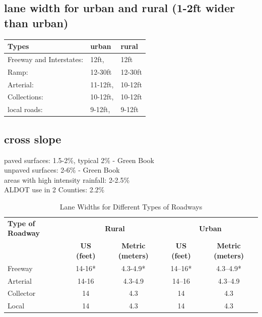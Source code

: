 \documentclass{article}
\begin{document}
  \subsection{lane width for urban and rural (1-2ft wider than urban)}
  \begin{tabular}{|l|l|l|}
    Types & urban & rural \\
    \hline
    Freeway and Interstates: & 12ft, & 12ft\\
    Ramp: & 12-30ft & 12-30ft \\ 
    Arterial: & 11-12ft, & 10-12ft \\
    Collections: & 10-12ft, & 10-12ft\\
    local roads: & 9-12ft, & 9-12ft  \\
  \end{tabular}

  \subsection{cross slope}
  paved surfaces: 1.5-2\%, typical 2\%  - Green Book\\
  unpaved surfaces: 2-6\% - Green Book\\
  areas with high intensity rainfall: 2-2.5\% \\
  ALDOT use in 2 Counties: 2.2\% \\



\begin{table}[ht]
\centering
\caption{Lane Widths for Different Types of Roadways}
\label{tab:lane_widths}
\begin{tabular}{@{}lcccc@{}}
\hline
\textbf{Type of Roadway} & \multicolumn{2}{c}{\textbf{Rural}} & \multicolumn{2}{c}{\textbf{Urban}} \\
                         & \textbf{US (feet)} & \textbf{Metric (meters)} & \textbf{US (feet)} & \textbf{Metric (meters)} \\ 
\hline
Freeway                  & 14-16*             & 4.3-4.9*                & 14–16*             & 4.3–4.9*                \\
Arterial                 & 14-16              & 4.3-4.9                 & 14–16              & 4.3–4.9                 \\
Collector                & 14                 & 4.3                     & 14                 & 4.3                     \\
Local                    & 14                 & 4.3                     & 14                 & 4.3                     \\
\hline
\end{tabular}
\end{table}
\end{document}
